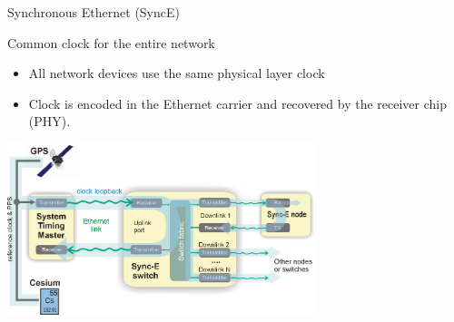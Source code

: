 \documentclass[compress,red]{beamer}
\begin{document}
\begin{frame}{Synchronous Ethernet (SyncE)}

 \begin{block}{Common clock for the entire network}
    \begin{itemize}
	 \item All network devices use the same physical layer clock
	 \item Clock is encoded in the Ethernet carrier and recovered by the receiver chip (PHY).
    \end{itemize}
\end{block}

\vspace{-0.2cm}

\begin{center}
\includegraphics[height=5cm]{misc/synce.pdf}
\end{center}

\end{frame}
\end{document}
